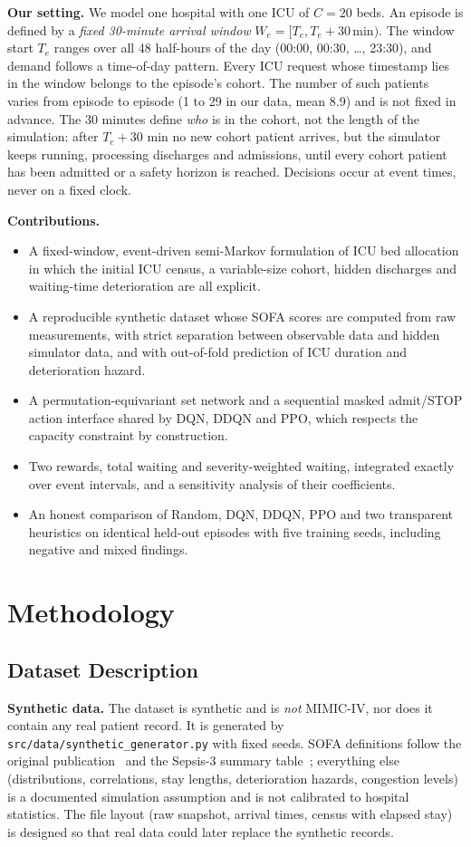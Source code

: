 \documentclass{rlreport}
\begin{document}
\textbf{Our setting.} We model one hospital with one ICU of $C=20$ beds. An episode is defined by a \emph{fixed 30-minute arrival window} $W_e=[T_e,T_e+30\,\mathrm{min})$. The window start $T_e$ ranges over all 48 half-hours of the day (00:00, 00:30, \dots, 23:30), and demand follows a time-of-day pattern. Every ICU request whose timestamp lies in the window belongs to the episode's cohort. The number of such patients varies from episode to episode (1 to 29 in our data, mean 8.9) and is not fixed in advance. The 30 minutes define \emph{who} is in the cohort, not the length of the simulation: after $T_e+30$ min no new cohort patient arrives, but the simulator keeps running, processing discharges and admissions, until every cohort patient has been admitted or a safety horizon is reached. Decisions occur at event times, never on a fixed clock.

\textbf{Contributions.}
\begin{itemize}
  \item A fixed-window, event-driven semi-Markov formulation of ICU bed allocation in which the initial ICU census, a variable-size cohort, hidden discharges and waiting-time deterioration are all explicit.
  \item A reproducible synthetic dataset whose SOFA scores are computed from raw measurements, with strict separation between observable data and hidden simulator data, and with out-of-fold prediction of ICU duration and deterioration hazard.
  \item A permutation-equivariant set network and a sequential masked admit/STOP action interface shared by DQN, DDQN and PPO, which respects the capacity constraint by construction.
  \item Two rewards, total waiting and severity-weighted waiting, integrated exactly over event intervals, and a sensitivity analysis of their coefficients.
  \item An honest comparison of Random, DQN, DDQN, PPO and two transparent heuristics on identical held-out episodes with five training seeds, including negative and mixed findings.
\end{itemize}

\section{Methodology}\label{sec:method}

\subsection{Dataset Description}\label{sec:data}
\textbf{Synthetic data.} The dataset is synthetic and is \emph{not} MIMIC-IV, nor does it contain any real patient record. It is generated by \texttt{src/data/synthetic\_generator.py} with fixed seeds. SOFA definitions follow the original publication~\cite{vincent1996sofa} and the Sepsis-3 summary table~\cite{singer2016sepsis3}; everything else (distributions, correlations, stay lengths, deterioration hazards, congestion levels) is a documented simulation assumption and is not calibrated to hospital statistics. The file layout (raw snapshot, arrival times, census with elapsed stay) is designed so that real data could later replace the synthetic records.
\end{document}
